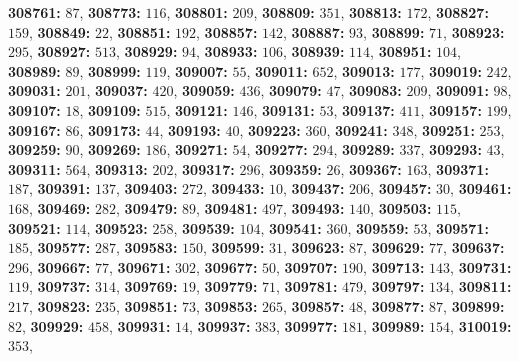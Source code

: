 \textsf{\bfseries 308761:} $87$, \textsf{\bfseries 308773:} $116$, \textsf{\bfseries 308801:} $209$, \textsf{\bfseries 308809:} $351$, \textsf{\bfseries 308813:} $172$, \textsf{\bfseries 308827:} $159$, \textsf{\bfseries 308849:} $22$, \textsf{\bfseries 308851:} $192$, \textsf{\bfseries 308857:} $142$, \textsf{\bfseries 308887:} $93$, \textsf{\bfseries 308899:} $71$, \textsf{\bfseries 308923:} $295$, \textsf{\bfseries 308927:} $513$, \textsf{\bfseries 308929:} $94$, \textsf{\bfseries 308933:} $106$, \textsf{\bfseries 308939:} $114$, \textsf{\bfseries 308951:} $104$, \textsf{\bfseries 308989:} $89$, \textsf{\bfseries 308999:} $119$, \textsf{\bfseries 309007:} $55$, \textsf{\bfseries 309011:} $652$, \textsf{\bfseries 309013:} $177$, \textsf{\bfseries 309019:} $242$, \textsf{\bfseries 309031:} $201$, \textsf{\bfseries 309037:} $420$, \textsf{\bfseries 309059:} $436$, \textsf{\bfseries 309079:} $47$, \textsf{\bfseries 309083:} $209$, \textsf{\bfseries 309091:} $98$, \textsf{\bfseries 309107:} $18$, \textsf{\bfseries 309109:} $515$, \textsf{\bfseries 309121:} $146$, \textsf{\bfseries 309131:} $53$, \textsf{\bfseries 309137:} $411$, \textsf{\bfseries 309157:} $199$, \textsf{\bfseries 309167:} $86$, \textsf{\bfseries 309173:} $44$, \textsf{\bfseries 309193:} $40$, \textsf{\bfseries 309223:} $360$, \textsf{\bfseries 309241:} $348$, \textsf{\bfseries 309251:} $253$, \textsf{\bfseries 309259:} $90$, \textsf{\bfseries 309269:} $186$, \textsf{\bfseries 309271:} $54$, \textsf{\bfseries 309277:} $294$, \textsf{\bfseries 309289:} $337$, \textsf{\bfseries 309293:} $43$, \textsf{\bfseries 309311:} $564$, \textsf{\bfseries 309313:} $202$, \textsf{\bfseries 309317:} $296$, \textsf{\bfseries 309359:} $26$, \textsf{\bfseries 309367:} $163$, \textsf{\bfseries 309371:} $187$, \textsf{\bfseries 309391:} $137$, \textsf{\bfseries 309403:} $272$, \textsf{\bfseries 309433:} $10$, \textsf{\bfseries 309437:} $206$, \textsf{\bfseries 309457:} $30$, \textsf{\bfseries 309461:} $168$, \textsf{\bfseries 309469:} $282$, \textsf{\bfseries 309479:} $89$, \textsf{\bfseries 309481:} $497$, \textsf{\bfseries 309493:} $140$, \textsf{\bfseries 309503:} $115$, \textsf{\bfseries 309521:} $114$, \textsf{\bfseries 309523:} $258$, \textsf{\bfseries 309539:} $104$, \textsf{\bfseries 309541:} $360$, \textsf{\bfseries 309559:} $53$, \textsf{\bfseries 309571:} $185$, \textsf{\bfseries 309577:} $287$, \textsf{\bfseries 309583:} $150$, \textsf{\bfseries 309599:} $31$, \textsf{\bfseries 309623:} $87$, \textsf{\bfseries 309629:} $77$, \textsf{\bfseries 309637:} $296$, \textsf{\bfseries 309667:} $77$, \textsf{\bfseries 309671:} $302$, \textsf{\bfseries 309677:} $50$, \textsf{\bfseries 309707:} $190$, \textsf{\bfseries 309713:} $143$, \textsf{\bfseries 309731:} $119$, \textsf{\bfseries 309737:} $314$, \textsf{\bfseries 309769:} $19$, \textsf{\bfseries 309779:} $71$, \textsf{\bfseries 309781:} $479$, \textsf{\bfseries 309797:} $134$, \textsf{\bfseries 309811:} $217$, \textsf{\bfseries 309823:} $235$, \textsf{\bfseries 309851:} $73$, \textsf{\bfseries 309853:} $265$, \textsf{\bfseries 309857:} $48$, \textsf{\bfseries 309877:} $87$, \textsf{\bfseries 309899:} $82$, \textsf{\bfseries 309929:} $458$, \textsf{\bfseries 309931:} $14$, \textsf{\bfseries 309937:} $383$, \textsf{\bfseries 309977:} $181$, \textsf{\bfseries 309989:} $154$, \textsf{\bfseries 310019:} $353$, 
